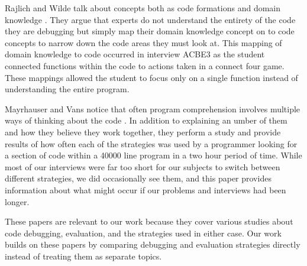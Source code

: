 Rajlich and Wilde talk about concepts both as code formations and domain knowledge \cite{1021348}.
They argue that experts do not understand the entirety of the code they are debugging but simply map their domain knowledge concept on to code concepts to narrow down the code areas they must look at.
This mapping of domain knowledge to code occurred in interview ACBE3 as the student connected functions within the code to actions taken in a connect four game.
These mappings allowed the student to focus only on a single function instead of understanding the entire program.

Mayrhauser and Vans notice that often program comprehension involves multiple ways of thinking about the code \cite{402076}.
In addition to explaining an umber of them and how they believe they work together,
	they perform a study and provide results of how often each of the strategies was used by a programmer looking for a section of code within a 40000 line program in a two hour period of time.
While most of our interviews were far too short for our subjects to switch between different strategies,
	we did occasionally see them, and this paper provides information about what might occur if our problems and interviews had been longer. 

These papers are relevant to our work because they cover various studies about code debugging, evaluation, and the strategies used in either case. Our work builds on these papers by comparing debugging and evaluation strategies directly instead of treating them as separate topics.
